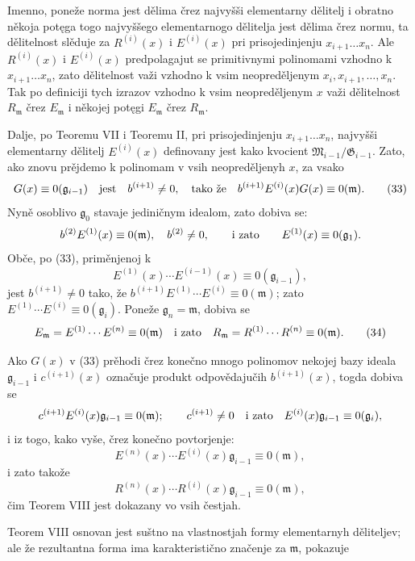 \documentclass[11pt]{article}
\providecommand{\Gmod}{\mathfrak G}
\providecommand{\Mmod}{\mathfrak M}
\providecommand{\mideal}{\mathfrak m}
\providecommand{\gideal}{\mathfrak g}
\begin{document}
Imenno, poneže norma jest dělima črez najvyšši elementarny dělitelj i obratno někoja potęga togo najvyššego elementarnogo dělitelja jest dělima črez normu, ta dělitelnost slěduje za $R^{(i)}(x)$ i $E^{(i)}(x)$ pri prisojedinjenju $x_{i+1}\ldots x_n$. Ale $R^{(i)}(x)$ i $E^{(i)}(x)$ predpolagajut se primitivnymi polinomami vzhodno k $x_{i+1}\ldots x_n$, zato dělitelnost važi vzhodno k vsim neopreděljenym $x_i,x_{i+1},\ldots,x_n$. Tak po definiciji tych izrazov vzhodno k vsim neopreděljenym $x$ važi dělitelnost $R_\mideal$ črez $E_\mideal$ i někojej potęgi $E_\mideal$ črez $R_\mideal$.

Dalje, po Teoremu VII i Teoremu II, pri prisojedinjenju $x_{i+1}\ldots x_n$, najvyšši elementarny dělitelj $E^{(i)}(x)$ definovany jest kako kvocient $\Mmod_{i-1}/\Gmod_{i-1}$. Zato, ako znovu prějdemo k polinomam v vsih neopreděljenyh $x$, za vsako
\begin{equation}
 G(x)\equiv0(\gideal_{i-1})
 \quad\hbox{jest}\quad b^{(i+1)}\ne0,
 \quad\hbox{tako že}\quad b^{(i+1)}E^{(i)}(x)G(x)\equiv0(\mideal).
\tag{33}
\end{equation}
Nyně osoblivo $\gideal_0$ stavaje jediničnym idealom, zato dobiva se:
\[
 b^{(2)}E^{(1)}(x)\equiv0(\mideal),\quad b^{(2)}\ne0,
 \qquad\hbox{i zato}\qquad E^{(1)}(x)\equiv0(\gideal_1).
\]
Obče, po (33), priměnjenoj k
\[
 E^{(1)}(x)\cdots E^{(i-1)}(x)\equiv0(\gideal_{i-1}),
\]
jest $b^{(i+1)}\ne0$ tako, že $b^{(i+1)}E^{(1)}\cdots E^{(i)}\equiv0(\mideal)$; zato $E^{(1)}\cdots E^{(i)}\equiv0(\gideal_i)$. Poneže $\gideal_n=\mideal$, dobiva se
\begin{equation}
 E_\mideal=E^{(1)}\cdots E^{(n)}\equiv0(\mideal)
 \quad\hbox{i zato}\quad
 R_\mideal=R^{(1)}\cdots R^{(n)}\equiv0(\mideal).
\tag{34}
\end{equation}

Ako $G(x)$ v (33) prěhodi črez konečno mnogo polinomov nekojej bazy ideala $\gideal_{i-1}$ i $c^{(i+1)}(x)$ označuje produkt odpovědajučih $b^{(i+1)}(x)$, togda dobiva se
\[
 c^{(i+1)}E^{(i)}(x)\gideal_{i-1}\equiv0(\mideal);
 \qquad c^{(i+1)}\ne0
 \quad\hbox{i zato}\quad E^{(i)}(x)\gideal_{i-1}\equiv0(\gideal_i),
\]
i iz togo, kako vyše, črez konečno povtorjenje:
\[
 E^{(n)}(x)\cdots E^{(i)}(x)\gideal_{i-1}\equiv0(\mideal),
\]
i zato takože
\[
 R^{(n)}(x)\cdots R^{(i)}(x)\gideal_{i-1}\equiv0(\mideal),
\]
čim Teorem VIII jest dokazany vo vsih čestjah.

Teorem VIII osnovan jest suštno na vlastnostjah formy elementarnyh děliteljev; ale že rezultantna forma ima karakteristično značenje za $\mideal$, pokazuje
\end{document}
